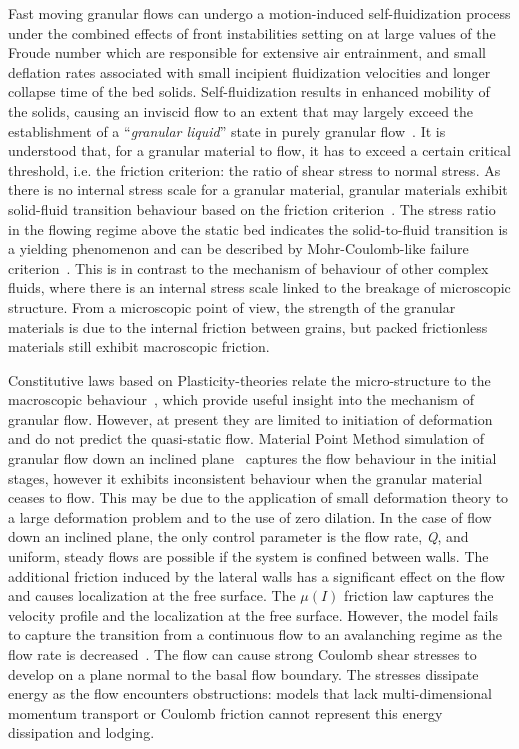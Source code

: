 Fast moving granular flows can undergo a motion-induced self-fluidization 
process under the combined effects of front instabilities setting on at large 
values of the Froude number which are responsible for extensive air 
entrainment, and small deflation rates associated with small incipient 
fluidization velocities and longer collapse time of the bed solids. 
Self-fluidization results in enhanced mobility of the solids, causing an 
inviscid flow to an extent that may largely exceed the establishment of a 
``\textit{granular liquid}'' state in purely granular 
flow~\citep{Bareschino2008}. It is understood that, for a granular material to 
flow, it has to exceed a certain critical threshold, i.e. the friction 
criterion: the ratio of shear stress to normal stress. As there is no internal 
stress scale for a granular material, granular materials exhibit solid-fluid 
transition behaviour based on the friction criterion~\citep{Forterre2008}. The 
stress ratio in the flowing regime above the static bed indicates the 
solid-to-fluid transition is a yielding phenomenon and can be described by 
Mohr-Coulomb-like failure criterion~\citep{Zhang1992}. This is in contrast to 
the mechanism of behaviour of other complex fluids, where there is an internal 
stress scale linked to the breakage of microscopic structure. From a 
microscopic point of view, the strength of the granular materials is due to the 
internal friction between grains, but packed frictionless materials still 
exhibit macroscopic friction.

Constitutive laws based on Plasticity-theories relate the micro-structure to 
the macroscopic behaviour~\citep{Roux2002}, which provide useful insight into 
the mechanism of granular flow. However, at present they are limited to 
initiation of deformation and do not predict the quasi-static flow. Material 
Point Method simulation of granular flow down an inclined 
plane~\citep{Abe2007,Bandara2009} captures the flow behaviour in the initial 
stages, however it exhibits inconsistent behaviour when the granular material 
ceases to flow. This may be due to the application of small deformation theory 
to a large deformation problem and to the use of zero dilation. In the case of 
flow down an inclined plane, the only control parameter is the flow rate, 
\textit{Q}, and uniform, steady flows are possible if the system is confined 
between walls. The additional friction induced by the lateral walls has a 
significant effect on the flow and causes localization at the free surface. The 
$\mu(\textit{I})$ friction law captures the velocity profile and the 
localization at the free surface. However, the model fails to capture the 
transition from a continuous flow to an avalanching regime as the flow rate is 
decreased~\citep{Pouliquen2006}. The flow can cause strong Coulomb shear 
stresses to develop on a plane normal to the basal flow boundary. The stresses 
dissipate energy as the flow encounters obstructions: models that lack 
multi-dimensional momentum transport or Coulomb friction cannot represent this 
energy dissipation and lodging. 


